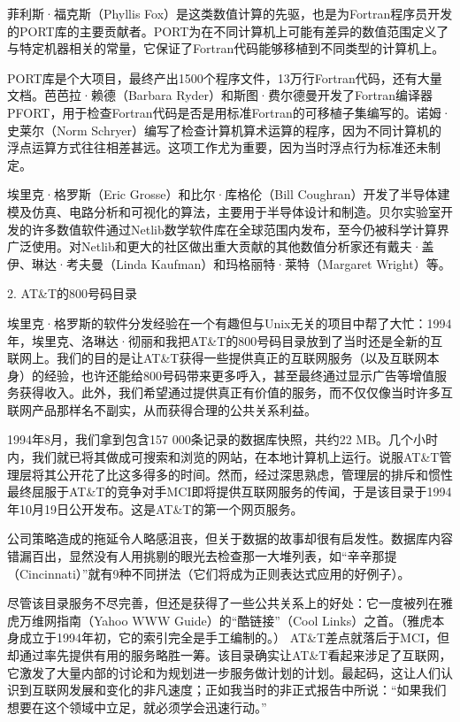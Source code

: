 \documentclass[a4paper,12pt,UTF8,twoside]{ctexbook}
\begin{document}
菲利斯·福克斯（Phyllis Fox）是这类数值计算的先驱，也是为Fortran程序员开发的PORT库的主要贡献者。PORT为在不同计算机上可能有差异的数值范围定义了与特定机器相关的常量，它保证了Fortran代码能够移植到不同类型的计算机上。

PORT库是个大项目，最终产出1500个程序文件，13万行Fortran代码，还有大量文档。芭芭拉·赖德（Barbara Ryder）和斯图·费尔德曼开发了Fortran编译器PFORT，用于检查Fortran代码是否是用标准Fortran的可移植子集编写的。诺姆·史莱尔（Norm Schryer）编写了检查计算机算术运算的程序，因为不同计算机的浮点运算方式往往相差甚远。这项工作尤为重要，因为当时浮点行为标准还未制定。

埃里克·格罗斯（Eric Grosse）和比尔·库格伦（Bill Coughran）开发了半导体建模及仿真、电路分析和可视化的算法，主要用于半导体设计和制造。贝尔实验室开发的许多数值软件通过Netlib数学软件库在全球范围内发布，至今仍被科学计算界广泛使用。对Netlib和更大的社区做出重大贡献的其他数值分析家还有戴夫·盖伊、琳达·考夫曼（Linda Kaufman）和玛格丽特·莱特（Margaret Wright）等。





2. AT\&T的800号码目录


埃里克·格罗斯的软件分发经验在一个有趣但与Unix无关的项目中帮了大忙：1994年，埃里克、洛琳达·彻丽和我把AT\&T的800号码目录放到了当时还是全新的互联网上。我们的目的是让AT\&T获得一些提供真正的互联网服务（以及互联网本身）的经验，也许还能给800号码带来更多呼入，甚至最终通过显示广告等增值服务获得收入。此外，我们希望通过提供真正有价值的服务，而不仅仅像当时许多互联网产品那样名不副实，从而获得合理的公共关系利益。

1994年8月，我们拿到包含157 000条记录的数据库快照，共约22 MB。几个小时内，我们就已将其做成可搜索和浏览的网站，在本地计算机上运行。说服AT\&T管理层将其公开花了比这多得多的时间。然而，经过深思熟虑，管理层的排斥和惯性最终屈服于AT\&T的竞争对手MCI即将提供互联网服务的传闻，于是该目录于1994年10月19日公开发布。这是AT\&T的第一个网页服务。

公司策略造成的拖延令人略感沮丧，但关于数据的故事却很有启发性。数据库内容错漏百出，显然没有人用挑剔的眼光去检查那一大堆列表，如“辛辛那提（Cincinnati）”就有9种不同拼法（它们将成为正则表达式应用的好例子）。

尽管该目录服务不尽完善，但还是获得了一些公共关系上的好处：它一度被列在雅虎万维网指南（Yahoo WWW Guide）的“酷链接”（Cool Links）之首。（雅虎本身成立于1994年初，它的索引完全是手工编制的。） AT\&T差点就落后于MCI，但却通过率先提供有用的服务略胜一筹。该目录确实让AT\&T看起来涉足了互联网，它激发了大量内部的讨论和为规划进一步服务做计划的计划。最起码，这让人们认识到互联网发展和变化的非凡速度；正如我当时的非正式报告中所说：“如果我们想要在这个领域中立足，就必须学会迅速行动。”
\end{document}
